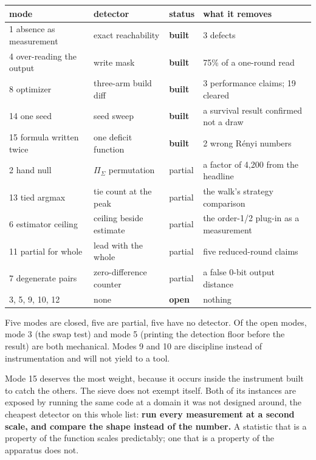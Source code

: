 \begin{center}
\begin{tabular}{@{}llll@{}}
\toprule
mode & detector & status & what it removes \\
\midrule
1 absence as measurement & exact reachability & \textbf{built} & 3 defects \\
4 over-reading the output & write mask & \textbf{built} & 75\% of a one-round read \\
8 optimizer & three-arm build diff & \textbf{built} & 3 performance claims; 19 cleared \\
14 one seed & seed sweep & \textbf{built} & a survival result confirmed not a draw \\
15 formula written twice & one deficit function & \textbf{built} & 2 wrong Rényi numbers \\
2 hand null & \(\Pi_\Sigma\) permutation & partial & a factor of 4,200 from the headline \\
13 tied argmax & tie count at the peak & partial & the walk's strategy comparison \\
6 estimator ceiling & ceiling beside estimate & partial & the order-1/2 plug-in as a measurement \\
11 partial for whole & lead with the whole & partial & five reduced-round claims \\
7 degenerate pairs & zero-difference counter & partial & a false 0-bit output distance \\
3, 5, 9, 10, 12 & none & \textbf{open} & nothing \\
\bottomrule
\end{tabular}
\end{center}

Five modes are closed, five are partial, five have no detector. Of the open modes, mode 3 (the swap test) and mode 5 (printing the detection floor before the result) are both mechanical. Modes 9 and 10 are discipline instead of instrumentation and will not yield to a tool.

Mode 15 deserves the most weight, because it occurs inside the instrument built to catch the others. The sieve does not exempt itself. Both of its instances are exposed by running the same code at a domain it was not designed around, the cheapest detector on this whole list: \textbf{run every measurement at a second scale, and compare the shape instead of the number.} A statistic that is a property of the function scales predictably; one that is a property of the apparatus does not.
